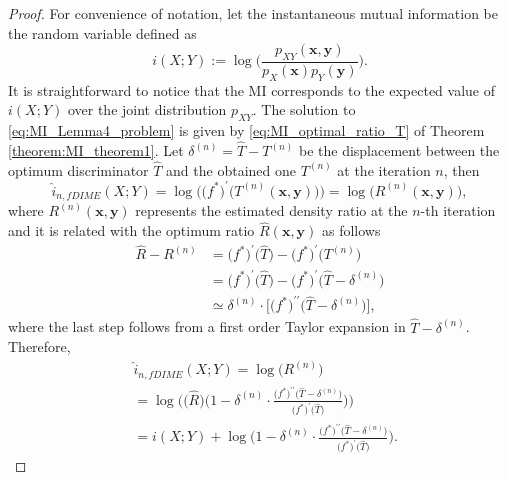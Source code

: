 \begin{proof}
For convenience of notation, let the instantaneous mutual information be the random variable defined as
\begin{equation}
i(X;Y) := \log\biggl(\frac{p_{XY}(\mathbf{x},\mathbf{y})}{p_X(\mathbf{x})p_Y(\mathbf{y})}\biggr).
\end{equation}
It is straightforward to notice that the MI corresponds to the expected value of $i(X;Y)$ over the joint distribution $p_{XY}$.
The solution to \eqref{eq:MI_Lemma4_problem} is given by \eqref{eq:MI_optimal_ratio_T} of Theorem \ref{theorem:MI_theorem1}. Let $\delta^{(n)}=\hat{T}-T^{(n)}$ be the displacement between the optimum discriminator $\hat{T}$ and the obtained one $T^{(n)}$ at the iteration $n$, then
\begin{equation}
\hat{i}_{n,fDIME}(X;Y)  = \log \biggl(\bigl(f^{*}\bigr)^{\prime}\bigl(T^{(n)}(\mathbf{x},\mathbf{y}) \bigr) \biggr) = \log \biggl(R^{(n)}(\mathbf{x},\mathbf{y}) \biggr),
\end{equation}
where $R^{(n)}(\mathbf{x},\mathbf{y})$ represents the estimated density ratio at the $n$-th iteration and it is related with the optimum ratio $\hat{R}(\mathbf{x},\mathbf{y})$ as follows
\begin{align}
\hat{R} - R^{(n)} & = \bigl(f^{*}\bigr)^{\prime}\bigl(\hat{T}\bigr) - \bigl(f^{*}\bigr)^{\prime}\bigl(T^{(n)}\bigr) \nonumber \\  
& = \bigl(f^{*}\bigr)^{\prime}\bigl(\hat{T}\bigr) - \bigl(f^{*}\bigr)^{\prime}\bigl(\hat{T}-\delta^{(n)}\bigr)  \nonumber \\
& \simeq  \delta^{(n)}\cdot\biggl[\bigl(f^{*}\bigr)^{\prime \prime}\bigl(\hat{T}-\delta^{(n)}\bigr)\biggr],
\end{align}
where the last step follows from a first order Taylor expansion in $\hat{T}-\delta^{(n)}$.
Therefore,
\begin{align}
& \hat{i}_{n,fDIME}(X;Y) = \log \bigl(R^{(n)}\bigr) \nonumber \\
 & =  \log \Biggl(\bigl(\hat{R}\bigr)\biggl(1-\delta^{(n)}\cdot \frac{\bigl(f^{*}\bigr)^{\prime \prime}\bigl(\hat{T}-\delta^{(n)}\bigr)}{\bigl(f^{*}\bigr)^{\prime}\bigl(\hat{T}\bigr)}  \biggr)\Biggr) \nonumber \\ 
& = i(X;Y) + \log \Biggl(1-\delta^{(n)}\cdot \frac{\bigl(f^{*}\bigr)^{\prime \prime}\bigl(\hat{T}-\delta^{(n)}\bigr)}{\bigl(f^{*}\bigr)^{\prime}\bigl(\hat{T}\bigr)}\Biggr).
\end{align}


\end{proof}
